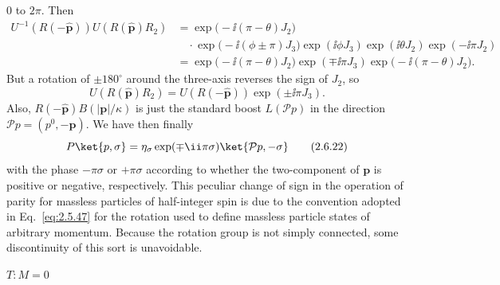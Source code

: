 $0$ to $2\pi$. Then
\[
\begin{aligned}
U^{-1}(R(-\hat{\mathbf{p}}))U(R(\hat{\mathbf{p}})R_2)
&=\exp\bigl(-\ii(\pi-\theta)J_2\bigr)\\
&\quad\cdot\exp\bigl(-\ii(\phi\pm\pi)J_3\bigr)
\exp(\ii\phi J_3)\exp(\ii\theta J_2)\exp(-\ii\pi J_2)\\
&=\exp\bigl(-\ii(\pi-\theta)J_2\bigr)
\exp(\mp \ii\pi J_3)
\exp\bigl(-\ii(\pi-\theta)J_2\bigr).
\end{aligned}
\]
But a rotation of $\pm180^\circ$ around the three-axis reverses the sign of
$J_2$, so
\begin{equation}
U(R(\hat{\mathbf{p}})R_2)
=U(R(-\hat{\mathbf{p}}))\exp(\pm \ii\pi J_3).
\tag{2.6.21}\label{eq:2.6.21}
\end{equation}
Also, $R(-\hat{\mathbf{p}})B(|\mathbf{p}|/\kappa)$ is just the standard boost
$L(\mathcal{P}p)$ in the direction $\mathcal{P}p=(p^0,-\mathbf{p})$. We have
then finally
\begin{equation}
P\ket{p,\sigma}
=\eta_\sigma\exp(\mp \ii\pi\sigma)\ket{\mathcal{P}p,-\sigma}
\tag{2.6.22}\label{eq:2.6.22}
\end{equation}
with the phase $-\pi\sigma$ or $+\pi\sigma$ according to whether the
two-component of $\mathbf{p}$ is positive or negative, respectively. This
peculiar change of sign in the operation of parity for massless particles of
half-integer spin is due to the convention adopted in Eq.~\eqref{eq:2.5.47} for the
rotation used to define massless particle states of arbitrary momentum.
Because the rotation group is not simply connected, some discontinuity of
this sort is unavoidable.

\medskip
\noindent\textbf{$T:M=0$}

